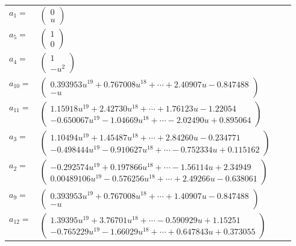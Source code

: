 \documentclass[1p]{elsarticle_modified}
\theoremstyle{definition}
\begin{document}
\begin{tabular}{m{7pt} m{180pt} m{7pt} m{180pt} }
\flushright $a_{1}=$&$\begin{pmatrix}0\\u\end{pmatrix}$ \\
\flushright $a_{5}=$&$\begin{pmatrix}1\\0\end{pmatrix}$ \\
\flushright $a_{4}=$&$\begin{pmatrix}1\\- u^2\end{pmatrix}$ \\
\flushright $a_{10}=$&$\begin{pmatrix}0.393953 u^{19}+0.767008 u^{18}+\cdots+2.40907 u-0.847488\\- u\end{pmatrix}$ \\
\flushright $a_{11}=$&$\begin{pmatrix}1.15918 u^{19}+2.42730 u^{18}+\cdots+1.76123 u-1.22054\\-0.650067 u^{19}-1.04669 u^{18}+\cdots-2.02490 u+0.895064\end{pmatrix}$ \\
\flushright $a_{3}=$&$\begin{pmatrix}1.10494 u^{19}+1.45487 u^{18}+\cdots+2.84260 u-0.234771\\-0.498444 u^{19}-0.910627 u^{18}+\cdots-0.752334 u+0.115162\end{pmatrix}$ \\
\flushright $a_{2}=$&$\begin{pmatrix}-0.292574 u^{19}+0.197866 u^{18}+\cdots-1.56114 u+2.34949\\0.00489106 u^{19}-0.576256 u^{18}+\cdots+2.49266 u-0.638061\end{pmatrix}$ \\
\flushright $a_{9}=$&$\begin{pmatrix}0.393953 u^{19}+0.767008 u^{18}+\cdots+1.40907 u-0.847488\\- u\end{pmatrix}$ \\
\flushright $a_{12}=$&$\begin{pmatrix}1.39395 u^{19}+3.76701 u^{18}+\cdots-0.590929 u+1.15251\\-0.765229 u^{19}-1.66029 u^{18}+\cdots+0.647843 u+0.373055\end{pmatrix}$ \\

\end{tabular}
\end{document}
